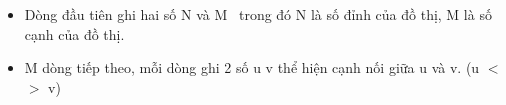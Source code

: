 \begin{itemize}
	\item     Dòng đầu tiên ghi hai số N và M  trong đó N là số đỉnh của đồ thị, M là số cạnh của đồ thị.   
	\item     M dòng tiếp theo, mỗi dòng ghi 2 số u v thể hiện cạnh nối giữa u và v. (u $<$$>$ v)   
\end{itemize}